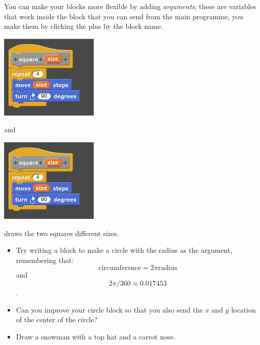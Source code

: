 \documentclass[11pt,a4paper]{scrartcl}
\begin{document}
You can make your blocks more flexible by adding \textsl{arguments};
these are variables that work inside the block that you can send from
the main programme, you make them by clicking the plus by the block
name.
\begin{center}
\includegraphics{two_squares_block_size_block.png}
\end{center}
and
\begin{center}
\includegraphics{two_squares_block_size_block.png}
\end{center}
draws the two squares different sizes. 

\begin{itemize}
\item Try writing a block to make a circle with the radius as the
  argument, remembering that:
$$
\mbox{circumference}=2\pi \mbox{radius}
$$
and $$2\pi / 360 \approx 0.017453$$.
\item Can you improve your circle block so that you also send the $x$ and $y$ location of the center of the circle?
\item Draw a snowman with a top hat and a carrot nose.
\end{itemize}
\end{document}
